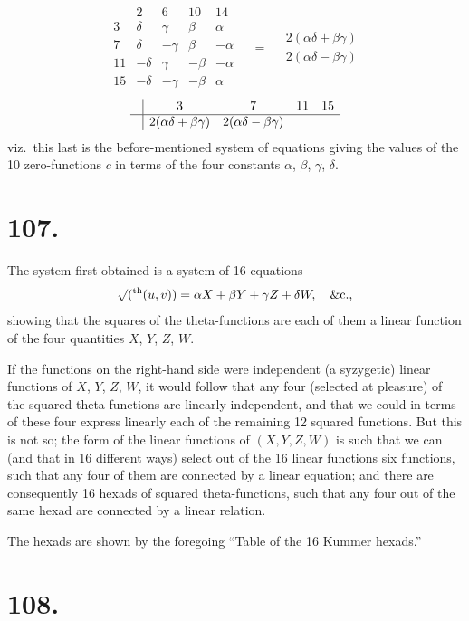 \documentclass[11pt,a4paper]{book}
\providecommand{\uth}{\textsuperscript{th}}
\begin{document}
\[
\begin{array}{c|cccc}
& 2 & 6 & 10 & 14 \\
\hline
3 & \delta & \gamma & \beta & \alpha \\
7 & \delta & -\gamma & \beta & -\alpha \\
11 & -\delta & \gamma & -\beta & -\alpha \\
15 & -\delta & -\gamma & -\beta & \alpha
\end{array}
\quad = \quad
\begin{array}{l}
2(\alpha\delta + \beta\gamma) \\
2(\alpha\delta - \beta\gamma)
\end{array}
\]
\[
\begin{array}{c|cccc}
& 3 & 7 & 11 & 15 \\
\hline
& 2(\alpha\delta + \beta\gamma) & 2(\alpha\delta - \beta\gamma)
\end{array}
\]
viz.\ this last is the before-mentioned system of equations giving the values of the 10 zero-functions $c$ in terms of the four constants $\alpha$, $\beta$, $\gamma$, $\delta$.

\newpage
\section*{107.}
\label{sec:107}

The system first obtained is a system of 16 equations
\[
\surd(\uth{}(u,v)) = \alpha X + \beta Y + \gamma Z + \delta W, \quad \text{\&c.,}
\]
showing that the squares of the theta-functions are each of them a linear function of the four quantities $X$, $Y$, $Z$, $W$.

If the functions on the right-hand side were independent (a syzygetic) linear functions of $X$, $Y$, $Z$, $W$, it would follow that any four (selected at pleasure) of the squared theta-functions are linearly independent, and that we could in terms of these four express linearly each of the remaining 12 squared functions. But this is not so; the form of the linear functions of $(X, Y, Z, W)$ is such that we can (and that in 16 different ways) select out of the 16 linear functions six functions, such that any four of them are connected by a linear equation; and there are consequently 16 hexads of squared theta-functions, such that any four out of the same hexad are connected by a linear relation.

The hexads are shown by the foregoing ``Table of the 16 Kummer hexads.''

\newpage
\section*{108.}
\label{sec:108}
\end{document}
